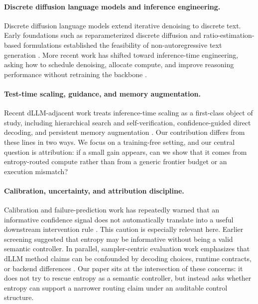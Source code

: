 \documentclass{article}
\begin{document}
\paragraph{Discrete diffusion language models and inference engineering.}
Discrete diffusion language models extend iterative denoising to discrete text. Early foundations such as reparameterized discrete diffusion and ratio-estimation-based formulations established the feasibility of non-autoregressive text generation \citep{zheng2023radd,lou2023sedd}. More recent work has shifted toward inference-time engineering, asking how to schedule denoising, allocate compute, and improve reasoning performance without retraining the backbone \citep{bai2026prism,lu2026block,xia2026metastate}.

\paragraph{Test-time scaling, guidance, and memory augmentation.}
Recent dLLM-adjacent work treats inference-time scaling as a first-class object of study, including hierarchical search and self-verification, confidence-guided direct decoding, and persistent memory augmentation \citep{bai2026prism,lu2026block,xia2026metastate,schiff2024guidance}. Our contribution differs from these lines in two ways. We focus on a training-free setting, and our central question is attribution: if a small gain appears, can we show that it comes from entropy-routed compute rather than from a generic frontier budget or an execution mismatch?

\paragraph{Calibration, uncertainty, and attribution discipline.}
Calibration and failure-prediction work has repeatedly warned that an informative confidence signal does not automatically translate into a useful downstream intervention rule \citep{zhu2023failure,deng2023answercal,actcabcodec2024}. This caution is especially relevant here. Earlier screening suggested that entropy may be informative without being a valid semantic controller. In parallel, sampler-centric evaluation work emphasizes that dLLM method claims can be confounded by decoding choices, runtime contracts, or backend differences \citep{samplercentric2026}. Our paper sits at the intersection of these concerns: it does not try to rescue entropy as a semantic controller, but instead asks whether entropy can support a narrower routing claim under an auditable control structure.
\end{document}
